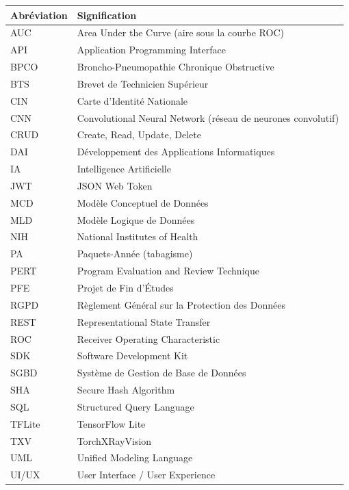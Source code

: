 \documentclass[12pt,a4paper]{report}
\begin{document}
\begin{longtable}{p{3.5cm} p{11cm}}
\toprule
\textbf{Abréviation} & \textbf{Signification} \\
\midrule
\endhead
AUC & Area Under the Curve (aire sous la courbe ROC) \\
API & Application Programming Interface \\
BPCO & Broncho-Pneumopathie Chronique Obstructive \\
BTS & Brevet de Technicien Supérieur \\
CIN & Carte d'Identité Nationale \\
CNN & Convolutional Neural Network (réseau de neurones convolutif) \\
CRUD & Create, Read, Update, Delete \\
DAI & Développement des Applications Informatiques \\
IA & Intelligence Artificielle \\
JWT & JSON Web Token \\
MCD & Modèle Conceptuel de Données \\
MLD & Modèle Logique de Données \\
NIH & National Institutes of Health \\
PA & Paquets-Année (tabagisme) \\
PERT & Program Evaluation and Review Technique \\
PFE & Projet de Fin d'Études \\
RGPD & Règlement Général sur la Protection des Données \\
REST & Representational State Transfer \\
ROC & Receiver Operating Characteristic \\
SDK & Software Development Kit \\
SGBD & Système de Gestion de Base de Données \\
SHA & Secure Hash Algorithm \\
SQL & Structured Query Language \\
TFLite & TensorFlow Lite \\
TXV & TorchXRayVision \\
UML & Unified Modeling Language \\
UI/UX & User Interface / User Experience \\
\bottomrule
\end{longtable}

\clearpage
{}
\end{document}
